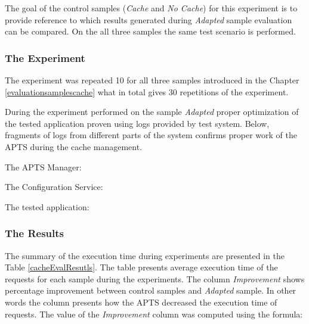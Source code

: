 \documentclass[10pt,a4paper]{article}
\begin{document}
The goal of the control samples (\textit{Cache} and \textit{No Cache}) for this experiment is to provide reference to which results generated during \textit{Adapted} sample evaluation can be compared. On the all three samples the same test scenario is performed. 



\subsubsection{The Experiment} 

The experiment was repeated 10 for all three samples introduced in the Chapter \ref{evaluationsamplescache} what in total gives 30 repetitions of the experiment.

During the experiment performed on the sample \textit{Adapted} proper optimization of the tested application proven using logs provided by test system. Below, fragments of logs from different parts of the system confirms proper work of the APTS during the cache management. 

The APTS Manager:

\noindent{}\vspace{1mm}

The Configuration Service:

\vspace{1mm}\noindent{}\vspace{1mm}

The tested application:

\vspace{1mm}\noindent{}\vspace{1mm}
 

\subsubsection{The Results} 

The summary of the execution time during experiments are presented in the Table \ref{cacheEvalResutls}. The table presents average execution time of the requests for each sample during the experiments. The column \textit{Improvement} shows percentage improvement between control samples and \textit{Adapted} sample. In other words the column presents how the APTS decreased the execution time of requests. The value of the \textit{Improvement} column was computed using the formula: 
\end{document}
